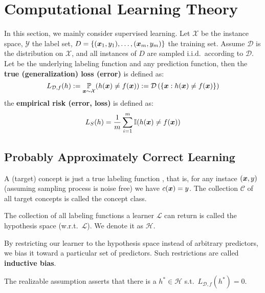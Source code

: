 \section{Computational Learning Theory}
In this section, we mainly consider supervised learning.
Let $\mathcal{X}$ be the instance space, $\mathcal{Y}$ the label set, $D = \{(\boldsymbol{x}_1, y_1), \ldots, 
(\boldsymbol{x}_m, y_m)\}$ the training set. Assume $\mathcal{D}$ is the distribution on $\mathcal{X}$, and all 
instances of $D$ are sampled i.i.d.\ according to $\mathcal{D}$. Let  be the underlying labeling 
function and  any prediction function, then the \textbf{true (generalization) loss (error)} is defined
as:
$$L_{\mathcal{D}, f}(h) := \operatorname*{\mathbb{P}}_{\boldsymbol{x}\sim\mathcal{X}}(h(\boldsymbol{x})\neq f(\boldsymbol{x})) := \mathcal{D}\left(\{\boldsymbol{x}: h(\boldsymbol{x})
\neq f(\boldsymbol{x})\}\right)$$
the \textbf{empirical risk (error, loss)} is defined as:
$$L_S(h) = \frac{1}{m}\sum_{i=1}^m \operatorname{\mathbb{I}}(h(\boldsymbol{x})\neq f(\boldsymbol{x}))$$

\subsection{Probably Approximately Correct Learning}

\begin{df}
    A (target) concept is just a true labeling function , that is, for any instace $(\boldsymbol{x}, y)$ 
    (assuming sampling process is noise free) we have $c(\boldsymbol{x}) = y$. The collection $\mathcal{C}$ of all 
    target concepts is called the concept class.
\end{df}

\begin{df}
    The collection of all labeling functions  a learner $\mathcal{L}$ can return is called the 
    hypothesis space (w.r.t.\ $\mathcal{L}$). We denote it as $\mathcal{H}$.
\end{df}

\begin{re}
    By restricting our learner to the hypothesis space instead of arbitrary predictors, we bias it toward a 
    particular set of predictors. Such restrictions are called \textbf{inductive bias}.
\end{re}

\begin{df}
    The realizable assumption asserts that there is a $h^* \in \mathcal{H}$ s.t.\ 
    $L_{\mathcal{D}, f}(h^*) = 0$.
\end{df}

